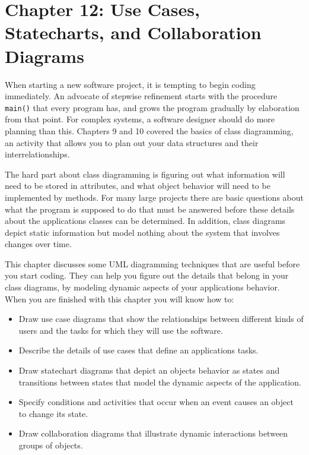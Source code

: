 \clearpage
\section{Chapter 12: Use Cases, Statecharts, and Collaboration Diagrams}

When starting a new software project, it is tempting to begin coding
immediately. An advocate of stepwise refinement starts with the
procedure \texttt{main()} that every program has, and grows the program
gradually by elaboration from that point. For complex systems, a
software designer should do more planning than this. Chapters 9 and 10
covered the basics of class diagramming, an activity that allows you to
plan out your data structures and their interrelationships.

The hard part about class diagramming is figuring out what information
will need to be stored in attributes, and what object behavior will
need to be implemented by methods. For many large projects there are
basic questions about what the program is supposed to do that must be
answered before these details about the application{\textquotesingle}s
classes can be determined. In addition, class diagrams depict static
information but model nothing about the system that involves changes
over time.

This chapter discusses some UML diagramming techniques that are useful
before you start coding. They can help you figure out the details that
belong in your class diagrams, by modeling dynamic aspects of your
application{\textquotesingle}s behavior. When you are finished with
this chapter you will know how to:

\begin{itemize}
\item Draw use case diagrams that show the relationships between
different kinds of users and the tasks for which they will use the
software.
\item Describe the details of use cases that define an
application{\textquotesingle}s tasks.
\item Draw statechart diagrams that depict an
object{\textquotesingle}s behavior as states and transitions between states that
model the dynamic aspects of the application.
\item Specify conditions and activities that occur when an event causes
an object to change its state.
\item Draw collaboration diagrams that illustrate dynamic interactions
between groups of objects.
\end{itemize}

